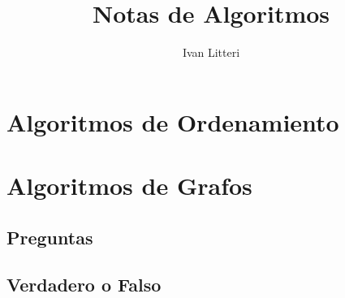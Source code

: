 \documentclass{article}
\title{Notas de Algoritmos}
\author{Ivan Litteri}
\date{}
\begin{document}
\maketitle
\lstset{language=Python}

% 

\section*{Algoritmos de Ordenamiento}



\section*{Algoritmos de Grafos}


\subsection*{Preguntas}


\subsection*{Verdadero o Falso}

\end{document}

